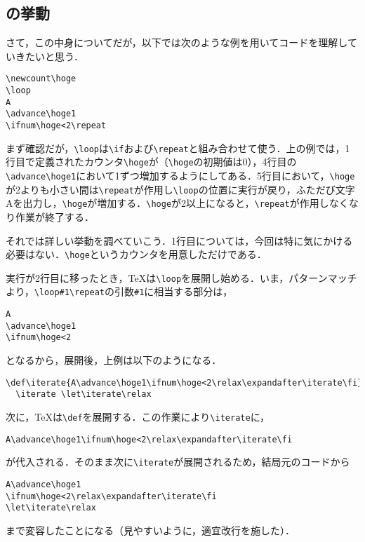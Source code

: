 \documentclass[autodetect-engine,dvipdfmx]{jsarticle}
\begin{document}
\subsection{の挙動}

さて，この中身についてだが，以下では次のような例を用いてコードを理解していきたいと思う．

\texsource
\begin{lstlisting}
\newcount\hoge
\loop
A
\advance\hoge1
\ifnum\hoge<2\repeat
\end{lstlisting}

まず確認だが，\verb|\loop|は\verb|\if|および\verb|\repeat|と組み合わせて使う．上の例では，1行目で定義されたカウンタ\verb|\hoge|が（\verb|\hoge|の初期値は0），4行目の\verb|\advance\hoge1|において1ずつ増加するようにしてある．5行目において，\verb|\hoge|が2よりも小さい間は\verb|\repeat|が作用し\verb|\loop|の位置に実行が戻り，ふただび文字Aを出力し，\verb|\hoge|が増加する．\verb|\hoge|が2以上になると，\verb|\repeat|が作用しなくなり作業が終了する．

それでは詳しい挙動を調べていこう．1行目については，今回は特に気にかける必要はない．\verb|\hoge|というカウンタを用意しただけである．

実行が2行目に移ったとき，\TeX は\verb|\loop|を展開し始める．いま，パターンマッチより，\verb|\loop#1\repeat|の引数\verb|#1|に相当する部分は，

\begin{lstlisting}
A
\advance\hoge1
\ifnum\hoge<2
\end{lstlisting}

となるから，展開後，上例は以下のようになる．

\begin{lstlisting}
\def\iterate{A\advance\hoge1\ifnum\hoge<2\relax\expandafter\iterate\fi}%
  \iterate \let\iterate\relax
\end{lstlisting}

次に，\TeX は\verb|\def|を展開する．この作業により\verb|\iterate|に，

\begin{lstlisting}
A\advance\hoge1\ifnum\hoge<2\relax\expandafter\iterate\fi
\end{lstlisting}

が代入される．そのまま次に\verb|\iterate|が展開されるため，結局元のコードから

\begin{lstlisting}
A\advance\hoge1
\ifnum\hoge<2\relax\expandafter\iterate\fi
\let\iterate\relax
\end{lstlisting}
まで変容したことになる（見やすいように，適宜改行を施した）．
\end{document}
